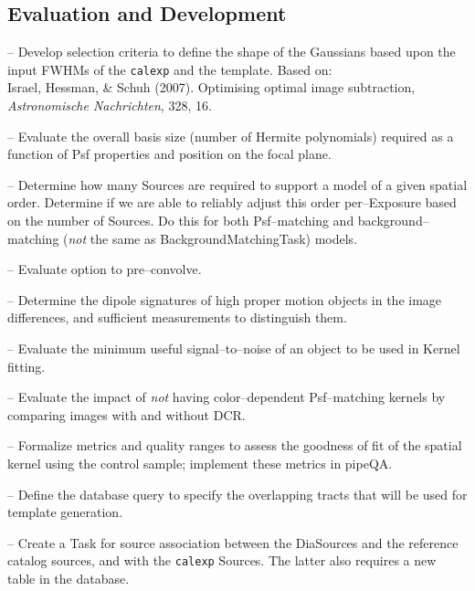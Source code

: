 \documentclass[prd, nofootinbib, floatfix, 11pt,tightenlines,times]{article}
\begin{document}
\subsection{Evaluation and Development}

-- Develop selection criteria to define the shape of the Gaussians
based upon the input FWHMs of the {\tt calexp} and the template.
Based on: \\ {Israel}, {Hessman}, \& {Schuh} (2007).  Optimising
optimal image subtraction, {\it Astronomische Nachrichten}, 328, 16.

-- Evaluate the overall basis size (number of Hermite polynomials)
required as a function of Psf properties and position on the focal plane.

-- Determine how many Sources are required to support a model of a given
spatial order.  Determine if we are able to reliably adjust this order
per--Exposure based on the number of Sources.  Do this for both
Psf--matching and background--matching ({\it not} the same as
BackgroundMatchingTask) models.

-- Evaluate option to pre--convolve.

-- Determine the dipole signatures of high proper motion objects in
the image differences, and sufficient measurements to distinguish
them.

-- Evaluate the minimum useful signal--to--noise of an object to be
used in Kernel fitting.

-- Evaluate the impact of {\it not} having color--dependent
Psf--matching kernels by comparing images with and without DCR.

-- Formalize metrics and quality ranges to assess the goodness of fit
of the spatial kernel using the control sample; implement these
metrics in pipeQA.


-- Define the database query to specify the overlapping tracts that
will be used for template generation.


-- Create a Task for source association between the DiaSources and the
reference catalog sources, and with the {\tt calexp} Sources.  The
latter also requires a new table in the database.


\end{document}
